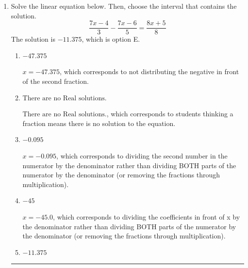 \documentclass{extbook}[14pt]
\newcommand{\litem}[1]{\item #1

\rule{\textwidth}{0.4pt}}
\begin{document}
\begin{enumerate}
{\begin{enumerate}[label=\Alph*.]
 $x = -0.6$, which corresponds to getting the negative of the actual solution.
\item \( -1.364 \)

* $x = -1.364$, which is the correct option.
\item \( \text{There are no Real solutions.} \)

 $\text{There are no Real solutions.}$, which corresponds to students thinking a fraction means there is no solution to the equation.
\item \( 0.273 \)

 $x = 0.273$, which corresponds to not distributing the negative in front of the second parentheses correctly.
\item \( -0.273 \)

 $x = -0.273$, which corresponds to not distributing the negative in front of the first parentheses correctly.
\end{enumerate}

\textbf{General Comment:} The most common mistake on this question is to not distribute the negative in front of the second fraction correctly. The best way to avoid this is putting the numerator in parentheses, which will help you remember to distribute the negative correctly.
}
\litem{
Solve the linear equation below. Then, choose the interval that contains the solution.
\[ \frac{7x -4}{3} - \frac{7x -6}{5} = \frac{8x + 5}{8} \]The solution is \( -11.375 \), which is option E.\begin{enumerate}[label=\Alph*.]
\item \( -47.375 \)

 $x = -47.375$, which corresponds to not distributing the negative in front of the second fraction.
\item \( \text{There are no Real solutions.} \)

 $\text{There are no Real solutions.}$, which corresponds to students thinking a fraction means there is no solution to the equation.
\item \( -0.095 \)

 $x = -0.095$, which corresponds to dividing the second number in the numerator by the denominator rather than dividing BOTH parts of the numerator by the denominator (or removing the fractions through multiplication).
\item \( -45 \)

 $x = -45.0$, which corresponds to dividing the coefficients in front of x by the denominator rather than dividing BOTH parts of the numerator by the denominator (or removing the fractions through multiplication).
\item \( -11.375 \)


\end{enumerate}}
\end{enumerate}
\end{document}
